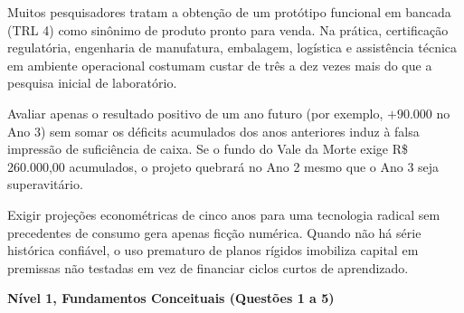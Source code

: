 \begin{boxErro}
  Muitos pesquisadores tratam a obtenção de um protótipo funcional em bancada (TRL 4) como sinônimo de produto pronto para venda. Na prática, certificação regulatória, engenharia de manufatura, embalagem, logística e assistência técnica em ambiente operacional costumam custar de três a dez vezes mais do que a pesquisa inicial de laboratório.
\end{boxErro}

\begin{boxErro}
  Avaliar apenas o resultado positivo de um ano futuro (por exemplo, $+90.000$ no Ano 3) sem somar os déficits acumulados dos anos anteriores induz à falsa impressão de suficiência de caixa. Se o fundo do Vale da Morte exige R\$\,260.000,00 acumulados, o projeto quebrará no Ano 2 mesmo que o Ano 3 seja superavitário.
\end{boxErro}

\begin{boxErro}
  Exigir projeções econométricas de cinco anos para uma tecnologia radical sem precedentes de consumo gera apenas ficção numérica. Quando não há série histórica confiável, o uso prematuro de planos rígidos imobiliza capital em premissas não testadas em vez de financiar ciclos curtos de aprendizado.
\end{boxErro}


\textbf{Nível 1, Fundamentos Conceituais (Questões 1 a 5)}

